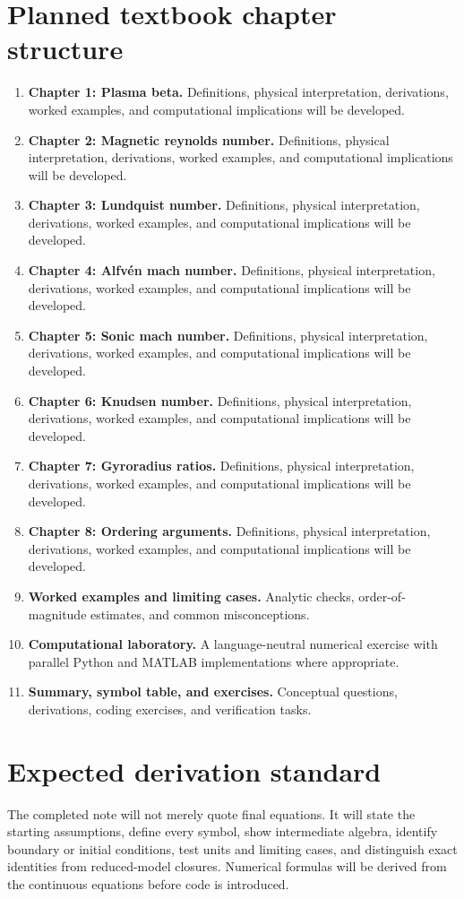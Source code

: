 \documentclass[11pt]{article}
\begin{document}
\section{Planned textbook chapter structure}
\begin{enumerate}[leftmargin=1.8em]
\item \textbf{Chapter 1: Plasma beta.} Definitions, physical interpretation, derivations, worked examples, and computational implications will be developed.
\item \textbf{Chapter 2: Magnetic reynolds number.} Definitions, physical interpretation, derivations, worked examples, and computational implications will be developed.
\item \textbf{Chapter 3: Lundquist number.} Definitions, physical interpretation, derivations, worked examples, and computational implications will be developed.
\item \textbf{Chapter 4: Alfv\'en mach number.} Definitions, physical interpretation, derivations, worked examples, and computational implications will be developed.
\item \textbf{Chapter 5: Sonic mach number.} Definitions, physical interpretation, derivations, worked examples, and computational implications will be developed.
\item \textbf{Chapter 6: Knudsen number.} Definitions, physical interpretation, derivations, worked examples, and computational implications will be developed.
\item \textbf{Chapter 7: Gyroradius ratios.} Definitions, physical interpretation, derivations, worked examples, and computational implications will be developed.
\item \textbf{Chapter 8: Ordering arguments.} Definitions, physical interpretation, derivations, worked examples, and computational implications will be developed.
\item \textbf{Worked examples and limiting cases.} Analytic checks, order-of-magnitude estimates, and common misconceptions.
\item \textbf{Computational laboratory.} A language-neutral numerical exercise with parallel Python and MATLAB implementations where appropriate.
\item \textbf{Summary, symbol table, and exercises.} Conceptual questions, derivations, coding exercises, and verification tasks.
\end{enumerate}

\section{Expected derivation standard}
The completed note will not merely quote final equations. It will state the starting assumptions, define every symbol, show intermediate algebra, identify boundary or initial conditions, test units and limiting cases, and distinguish exact identities from reduced-model closures. Numerical formulas will be derived from the continuous equations before code is introduced.
\end{document}
